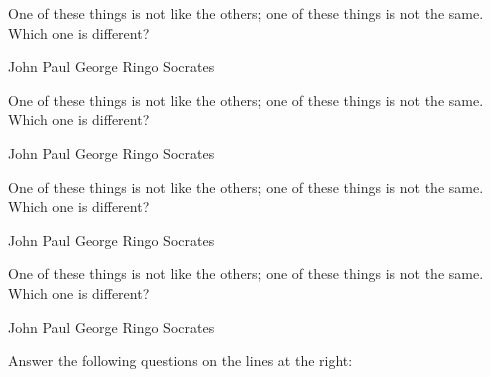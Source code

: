 \documentclass[12pt]{exam}
\begin{document}
\begin{questions}
\newpage


\addpoints
\question[10]
One of these things is not like the others; one of these things is not
the same. Which one is different?

\begin{choices}
\choice John
\choice Paul
\choice George
\choice Ringo
\CorrectChoice Socrates
\end{choices}


\addpoints
\question[10]
One of these things is not like the others; one of these things is not
the same. Which one is different?

\begin{oneparchoices}
\choice John
\choice Paul
\choice George
\choice Ringo
\CorrectChoice Socrates
\end{oneparchoices}



\addpoints
\question[10]
One of these things is not like the others; one of these things is not
the same. Which one is different?

\begin{checkboxes}
\choice John
\choice Paul
\choice George
\choice Ringo
\CorrectChoice Socrates
\end{checkboxes}

\addpoints
\question[10]
One of these things is not like the others; one of these things is not
the same. Which one is different?

\begin{oneparcheckboxes}
\choice John
\choice Paul
\choice George
\choice Ringo
\CorrectChoice Socrates
\end{oneparcheckboxes}



\addpoints
\question[20]
Answer the following questions on the lines at the right:




\end{questions}
\end{document}
